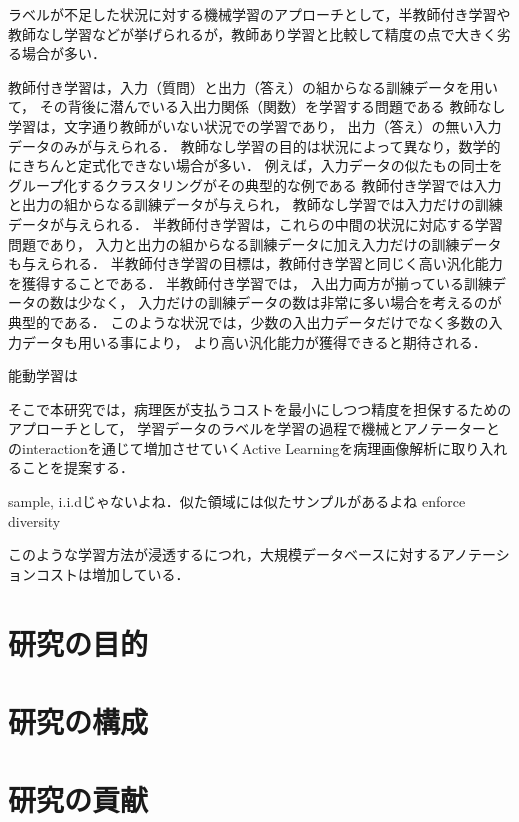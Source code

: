 ラベルが不足した状況に対する機械学習のアプローチとして，半教師付き学習や教師なし学習などが挙げられるが，教師あり学習と比較して精度の点で大きく劣る場合が多い．

教師付き学習は，入力（質問）と出力（答え）の組からなる訓練データを用いて， その背後に潜んでいる入出力関係（関数）を学習する問題である
教師なし学習は，文字通り教師がいない状況での学習であり， 出力（答え）の無い入力データのみが与えられる． 教師なし学習の目的は状況によって異なり，数学的にきちんと定式化できない場合が多い． 例えば，入力データの似たもの同士をグループ化するクラスタリングがその典型的な例である
教師付き学習では入力と出力の組からなる訓練データが与えられ， 教師なし学習では入力だけの訓練データが与えられる． 
半教師付き学習は，これらの中間の状況に対応する学習問題であり， 入力と出力の組からなる訓練データに加え入力だけの訓練データも与えられる． 
半教師付き学習の目標は，教師付き学習と同じく高い汎化能力を獲得することである． 
半教師付き学習では， 入出力両方が揃っている訓練データの数は少なく， 入力だけの訓練データの数は非常に多い場合を考えるのが典型的である． 
このような状況では，少数の入出力データだけでなく多数の入力データも用いる事により， より高い汎化能力が獲得できると期待される．

能動学習は

そこで本研究では，病理医が支払うコストを最小にしつつ精度を担保するためのアプローチとして，
学習データのラベルを学習の過程で機械とアノテーターとのinteractionを通じて増加させていくActive Learningを病理画像解析に取り入れることを提案する．


sample, i.i.dじゃないよね．似た領域には似たサンプルがあるよね
enforce diversity 


このような学習方法が浸透するにつれ，大規模データベースに対するアノテーションコストは増加している．


\section{研究の目的}

\section{研究の構成}

\section{研究の貢献}



